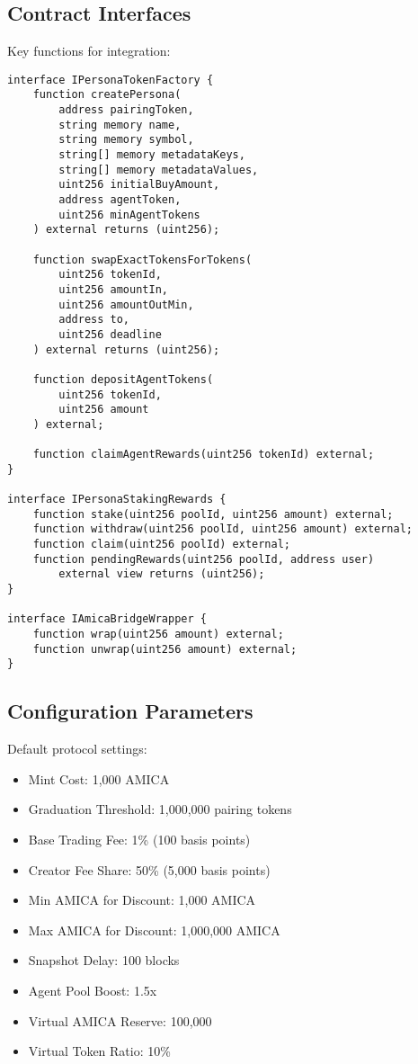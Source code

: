 \documentclass{article}
\begin{document}
\begin{appendices}
\subsection{Contract Interfaces}

Key functions for integration:

\begin{verbatim}
interface IPersonaTokenFactory {
    function createPersona(
        address pairingToken,
        string memory name,
        string memory symbol,
        string[] memory metadataKeys,
        string[] memory metadataValues,
        uint256 initialBuyAmount,
        address agentToken,
        uint256 minAgentTokens
    ) external returns (uint256);
    
    function swapExactTokensForTokens(
        uint256 tokenId,
        uint256 amountIn,
        uint256 amountOutMin,
        address to,
        uint256 deadline
    ) external returns (uint256);
    
    function depositAgentTokens(
        uint256 tokenId,
        uint256 amount
    ) external;
    
    function claimAgentRewards(uint256 tokenId) external;
}

interface IPersonaStakingRewards {
    function stake(uint256 poolId, uint256 amount) external;
    function withdraw(uint256 poolId, uint256 amount) external;
    function claim(uint256 poolId) external;
    function pendingRewards(uint256 poolId, address user) 
        external view returns (uint256);
}

interface IAmicaBridgeWrapper {
    function wrap(uint256 amount) external;
    function unwrap(uint256 amount) external;
}
\end{verbatim}

\subsection{Configuration Parameters}

Default protocol settings:

\begin{itemize}
    \item Mint Cost: 1,000 AMICA
    \item Graduation Threshold: 1,000,000 pairing tokens
    \item Base Trading Fee: 1\% (100 basis points)
    \item Creator Fee Share: 50\% (5,000 basis points)
    \item Min AMICA for Discount: 1,000 AMICA
    \item Max AMICA for Discount: 1,000,000 AMICA
    \item Snapshot Delay: 100 blocks
    \item Agent Pool Boost: 1.5x
    \item Virtual AMICA Reserve: 100,000
    \item Virtual Token Ratio: 10\%
\end{itemize}

\end{appendices}
\end{document}
